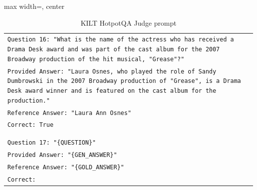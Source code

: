 \documentclass[11pt]{article}
\begin{document}
\begin{table}[ht]
\begin{adjustbox}{max width=\textwidth, center}
\begin{tabular}{>{\raggedright\arraybackslash\tt}p{}<{}}
Question 16: "What is the name of the actress who has received a Drama Desk award and was part of the cast album for the 2007 Broadway production of the hit musical, "Grease"?"\\
Provided Answer: "Laura Osnes, who played the role of Sandy Dumbrowski in the 2007 Broadway production of "Grease", is a Drama Desk award winner and is featured on the cast album for the production."\\
Reference Answer: "Laura Ann Osnes"\\
Correct: True\\
\\
\\
Question 17: "\{QUESTION\}"\\
Provided Answer: "\{GEN\_ANSWER\}"\\
Reference Answer: "\{GOLD\_ANSWER\}"\\
Correct:\\
        \bottomrule
    \end{tabular}
    \end{adjustbox}
    \caption{KILT HotpotQA Judge prompt}
    \label{tab:hotpotqa_kilt_prompt}
\end{table}
\end{document}
